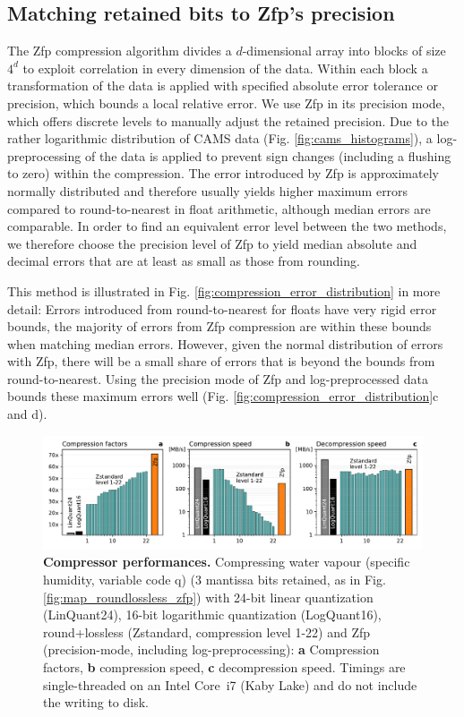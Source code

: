 \subsection{Matching retained bits to Zfp's precision}

The Zfp compression algorithm divides a $d$-dimensional array into blocks of size $4^d$ to exploit correlation
in every dimension of the data. Within each block a transformation of the data is applied with specified absolute
error tolerance or precision, which bounds a local relative error. We use Zfp in its precision mode, which offers
discrete levels to manually adjust the retained precision. Due to the rather logarithmic distribution of CAMS data
(Fig. \ref{fig:cams_histograms}), a log-preprocessing of the data is applied to prevent sign changes (including a flushing to zero) within
the compression. The error introduced by Zfp is approximately normally distributed and therefore usually yields
higher maximum errors compared to round-to-nearest in float arithmetic, although median errors are comparable.
In order to find an equivalent error level between the two methods, we therefore choose the precision level of Zfp
to yield median absolute and decimal errors that are at least as small as those from rounding.

This method is illustrated in Fig. \ref{fig:compression_error_distribution} in more detail: Errors introduced from
round-to-nearest for floats have very rigid error bounds, the majority of errors from Zfp compression are within
these bounds when matching median errors. However, given the normal distribution of errors with Zfp, there will
be a small share of errors that is beyond the bounds from round-to-nearest. Using the precision mode of Zfp and
log-preprocessed data bounds these maximum errors well (Fig. \ref{fig:compression_error_distribution}c and d).

\begin{figure}[tbhp]
	\includegraphics[width=1\textwidth]{Figures/compression/compression_speed.pdf}
	\caption{\textbf{Compressor performances.} 
	Compressing water vapour (specific humidity, variable code q) (3 mantissa bits retained, as in Fig.
	\ref{fig:map_roundlossless_zfp}) with 24-bit linear quantization (LinQuant24), 16-bit logarithmic quantization
	(LogQuant16), round+lossless (Zstandard, compression level 1-22) and Zfp (precision-mode,
	including log-preprocessing): \textbf{a} Compression factors, \textbf{b} compression speed, \textbf{c}
	decompression speed. Timings are single-threaded on an Intel Core\texttrademark~i7 (Kaby Lake) and do not include the writing to disk.}
	\label{fig:compression_speed}
\end{figure}

